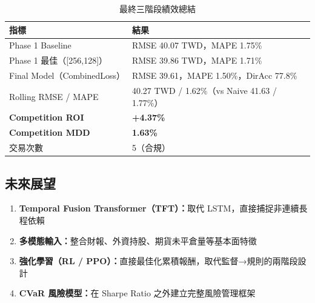\documentclass[12pt,a4paper]{article}
\begin{document}
\begin{table}[H]
\centering
\caption{最終三階段績效總結}
\begin{tabular}{ll}
\toprule
\textbf{指標} & \textbf{結果} \\
\midrule
Phase 1 Baseline           & RMSE 40.07 TWD，MAPE 1.75\% \\
Phase 1 最佳（[256,128]）   & RMSE 39.86 TWD，MAPE 1.71\% \\
Final Model（CombinedLoss） & RMSE 39.61，MAPE 1.50\%，DirAcc 77.8\% \\
Rolling RMSE / MAPE        & 40.27 TWD / 1.62\%（vs Naive 41.63 / 1.77\%） \\
\textbf{Competition ROI}   & \textbf{+4.37\%} \\
\textbf{Competition MDD}   & \textbf{1.63\%} \\
交易次數                    & 5（合規） \\
\bottomrule
\end{tabular}
\end{table}

\subsection{未來展望}

\begin{enumerate}
  \item \textbf{Temporal Fusion Transformer（TFT）：}取代 LSTM，直接捕捉非連續長程依賴
  \item \textbf{多模態輸入：}整合財報、外資持股、期貨未平倉量等基本面特徵
  \item \textbf{強化學習（RL / PPO）：}直接最佳化累積報酬，取代監督→規則的兩階段設計
  \item \textbf{CVaR 風險模型：}在 Sharpe Ratio 之外建立完整風險管理框架
\end{enumerate}
\end{document}
